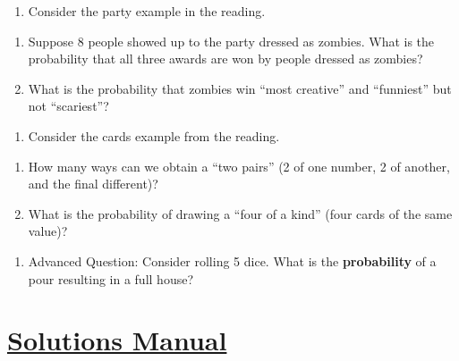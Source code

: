 \documentclass[
  letterpaper,
  DIV=11,
  numbers=noendperiod]{scrreprt}
\providecommand{\tightlist}{%
  \setlength{\itemsep}{0pt}\setlength{\parskip}{0pt}}\usepackage{longtable,booktabs,array}
\begin{document}
\begin{enumerate}
\def\labelenumi{\arabic{enumi}.}
\setcounter{enumi}{4}
\tightlist
\item
  Consider the party example in the reading.
\end{enumerate}

\begin{enumerate}
\def\labelenumi{\alph{enumi}.}
\tightlist
\item
  Suppose 8 people showed up to the party dressed as zombies. What is
  the probability that all three awards are won by people dressed as
  zombies?\\
\item
  What is the probability that zombies win ``most creative'' and
  ``funniest'' but not ``scariest''?
\end{enumerate}

\begin{enumerate}
\def\labelenumi{\arabic{enumi}.}
\setcounter{enumi}{5}
\tightlist
\item
  Consider the cards example from the reading.
\end{enumerate}

\begin{enumerate}
\def\labelenumi{\alph{enumi}.}
\tightlist
\item
  How many ways can we obtain a ``two pairs'' (2 of one number, 2 of
  another, and the final different)?\\
\item
  What is the probability of drawing a ``four of a kind'' (four cards of
  the same value)?
\end{enumerate}

\begin{enumerate}
\def\labelenumi{\arabic{enumi}.}
\setcounter{enumi}{6}
\tightlist
\item
  Advanced Question: Consider rolling 5 dice. What is the
  \textbf{probability} of a pour resulting in a full house?
\end{enumerate}

\section*{\texorpdfstring{\href{https://ds-usafa.github.io/CPS-Solutions-Manual/PROBRULES.html}{Solutions
Manual}}{Solutions Manual}}\label{solutions-manual-8}
\end{document}
